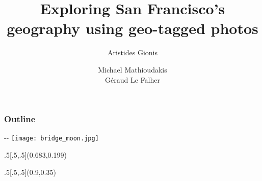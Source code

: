 \documentclass[final,logo=yellowexc,fleqn,svgnames]{aaltoslides}
\title{Exploring San Francisco's geography using geo-tagged photos}
\author{Aristides Gionis \and Michael Mathioudakis \\ Géraud Le Falher}
\institute{December 10, 2013}
\date{}
\begin{document}
\aaltotitleframe{}
\begin{frame}
\frametitle{Outline}
\tableofcontents
\end{frame}


{}%
\begin{adjustwidth}{-\oddsidemargin-1in}{-\rightmargin}%
\texttt{[image: bridge\_moon.jpg]}%
\end{adjustwidth}
\begin{textblock}{.5}[.5,.5](0.683,0.199)%
	\begin{centering}
	\end{centering}
\end{textblock}
\begin{textblock}{.5}[.5,.5](0.9,0.35)%
	\begin{centering}
		\scalebox{1.7}{\textcolor{white}{Questions?}}
	\end{centering}
\end{textblock}
\end{document}
